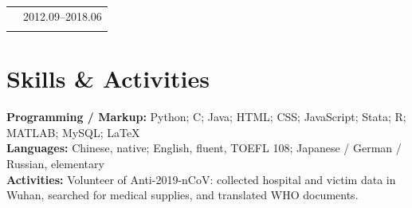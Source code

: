 \documentclass[10pt,a4paper]{article}
\makeatletter
\newcommand{\shortentry}[3]{%
  \begin{tabularx}{\textwidth}{@{}>{\raggedright\arraybackslash}X >{\raggedleft\arraybackslash}p{0.18\textwidth}@{}}
    {\small\textbf{#1}} & {\small #2} \\
    \multicolumn{2}{@{}>{\raggedright\arraybackslash}X@{}}{{\small\textit{#3}}} \\
  \end{tabularx}\vspace{1pt}
}
\newcommand{\skillline}[2]{{\small\textbf{#1:} #2}\\[1pt]}
\makeatother
\begin{document}
\shortentry
{Chengdu Foreign Languages School}
{2012.09--2018.06}
{Secondary Education; graduated with first place.}

\section*{Skills \& Activities}
\skillline{Programming / Markup}{Python; C; Java; HTML; CSS; JavaScript; Stata; R; MATLAB; MySQL; \LaTeX}
\skillline{Languages}{Chinese, native; English, fluent, TOEFL 108; Japanese / German / Russian, elementary}
\skillline{Activities}{Volunteer of Anti-2019-nCoV: collected hospital and victim data in Wuhan, searched for medical supplies, and translated WHO documents.}
\end{document}
